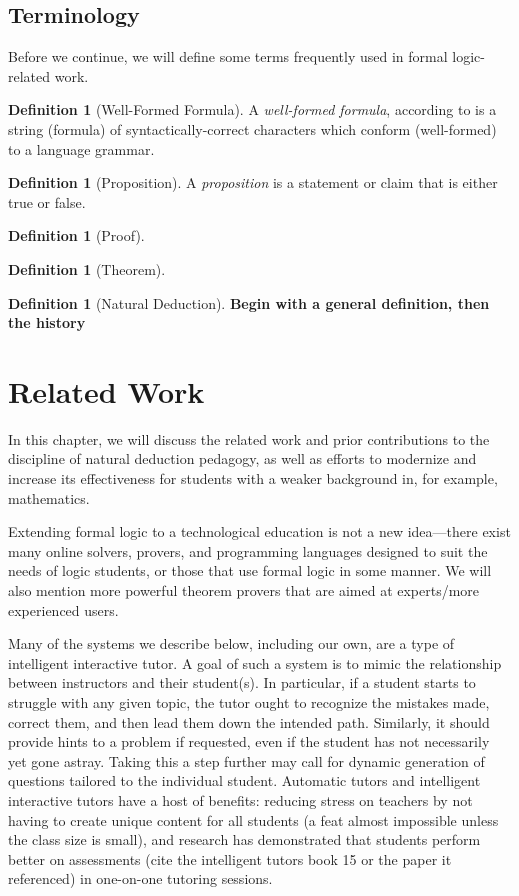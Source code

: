 \documentclass[ms]{uncgdissertationexp2}
\theoremstyle{plain}
\theoremstyle{definition}
\newtheorem{definition}[theorem]{Definition}
\theoremstyle{remark}
\begin{document}
\section{Terminology}
Before we continue, we will define some terms frequently used in formal logic-related work.
\begin{definition}[Well-Formed Formula]
	A \textit{well-formed formula}, according to \cite{encyclopedia} is a string (formula) of syntactically-correct characters which conform (well-formed) to a language grammar.
\end{definition}
    
\begin{definition}[Proposition]
	A \textit{proposition} is a statement or claim that is either true or false.
\end{definition}

\begin{definition}[Proof]
\end{definition}
    
\begin{definition}[Theorem]
\end{definition}

\begin{definition}[Natural Deduction]
	\textbf{Begin with a general definition, then the history}
\end{definition}

\chapter{Related Work}
In this chapter, we will discuss the related work and prior contributions to the discipline of natural deduction pedagogy, as well as efforts to modernize and increase its effectiveness for students with a weaker background in, for example, mathematics. 

Extending formal logic to a technological education is not a new idea---there exist many online solvers, provers, and programming languages designed to suit the needs of logic students, or those that use formal logic in some manner. We will also mention more powerful theorem provers that are aimed at experts/more experienced users.

Many of the systems we describe below, including our own, are a type of intelligent interactive tutor. A goal of such a system is to mimic the relationship between instructors and their student(s). In particular, if a student starts to struggle with any given topic, the tutor ought to recognize the mistakes made, correct them, and then lead them down the intended path. Similarly, it should provide hints to a problem if requested, even if the student has not necessarily yet gone astray. Taking this a step further may call for dynamic generation of questions tailored to the individual student. Automatic tutors and intelligent interactive tutors have a host of benefits: reducing stress on teachers by not having to create unique content for all students (a feat almost impossible unless the class size is small), and research has demonstrated that students perform better on assessments (cite the intelligent tutors book 15 or the paper it referenced) in one-on-one tutoring sessions.
\end{document}
